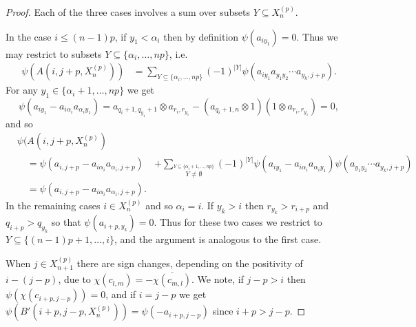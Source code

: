 \documentclass[11pt]{amsart}
\def\a{\alpha}
\theoremstyle{definition}
\begin{document}
\begin{proof} Each of the three cases involves a sum over subsets $Y\subseteq X_n^{(p)}$. 

In the case $i\le(n-1)p$, if $y_1<\a_i$ then by definition $\psi(a_{iy_1})=0$. Thus we may restrict to subsets $Y\subseteq\{\a_i,\ldots,np\}$, i.e.
        \begin{align*}
        \psi(A(i,j+p,X_n^{(p)}))  &= \sum_{Y\subseteq \{\a_i,\ldots,np\}}(-1)^{|Y|}\psi(a_{iy_1}a_{y_1y_2}\cdots a_{y_k,j+p}).
        \end{align*}
For any $y_1\in\{\a_i+1,\ldots,np\}$ we get 
{\small
  \[\psi(a_{iy_1}-a_{i\a_i}a_{\a_iy_1}) = a_{q_i+1,q_{y_1}+1}\otimes a_{r_i,r_{y_1}}-(a_{q_i+1,n}\otimes 1)(1\otimes a_{r_i,r_{y_1}}) = 0,\]
}
and so 
{\small
        \begin{align*}
          &\psi(A(i,j+p,X_n^{(p)})                  & \\
          &\quad =\psi(a_{i,j+p}-a_{i\a_i}a_{\a_i,j+p}) &+\sum_{{\scriptscriptstyle \overset{Y\subseteq \{\a_i+1,\ldots,np\}}{Y\ne\emptyset}}}(-1)^{|Y|}\psi(a_{iy_1}-a_{i\a_i}a_{\a_iy_1})\psi(a_{y_1y_2}\cdots a_{y_k,j+p})\\
          &\quad =\psi(a_{i,j+p}-a_{i\a_i}a_{\a_i,j+p}).
        \end{align*}
}
In the remaining cases $i\in X_n^{(p)}$ and so $\a_i=i$. If $y_k>i$ then $r_{y_k}>r_{i+p}$ and $q_{i+p}>q_{y_k}$ so that $\psi(a_{i+p,y_k})=0$. Thus for these two cases we restrict to $Y\subseteq\{(n-1)p+1,\ldots,i\}$, and the argument is analogous to the first case. 

When $j\in X_{n+1}^{(p)}$ there are sign changes, depending on the positivity of $i-(j-p)$, due to $\chi(c_{l,m})=-\overline{\chi(c_{m,l})}$. We note, if $j-p>i$ then $\psi(\chi(c_{i+p,j-p})) = 0$, and if $i=j-p$ we get $\psi(B'(i+p,j-p,X_n^{(p)})) = \psi(-a_{i+p,j-p})$ since $i+p>j-p$.
\end{proof}
\end{document}
